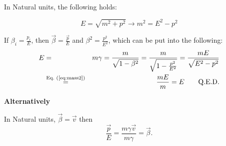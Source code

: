 \documentclass[a4paper]{article}
\begin{document}


In Natural units, the following holds:

\begin{equation}
    E = \sqrt{m^2 + p^2} \to m^2 = E^2 - p^2 \label{eq:mass2}
\end{equation}

If $\beta_i = \frac{p_i}{E}$, then $\vec{\beta}=\frac{\vec{p}}{E}$ and
$\beta^2 = \frac{p^2}{E^2}$, which can be put into the following:
\begin{eqnarray}
    E &=& m \gamma = \frac{m}{\sqrt{1 - \beta^2}} =
            \frac{m}{\sqrt{1 - \frac{p^2}{E^2}}} =
            \frac{m E}{\sqrt{E^2 - p^2}} \\
        &\overset{\text{Eq.~(\ref{eq:mass2})}}{=}&
            \frac{m E}{m} = E \quad\quad \text{\hfill Q.E.D.} 
\end{eqnarray}

\textbf{Alternatively}

In Natural units, $\vec{\beta} = \vec{v}$ then
\begin{equation}
    \frac{\vec{p}}{E} = \frac{m \gamma\vec{v}}{m \gamma} = \vec{\beta}.
\end{equation}
\end{document}
